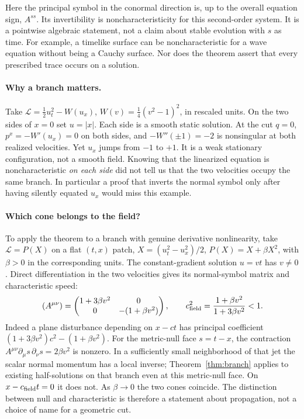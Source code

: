 Here the principal symbol in the conormal direction is, up to the overall equation sign, $A^{ss}$. Its invertibility is noncharacteristicity for this second-order system. It is a pointwise algebraic statement, not a claim about stable evolution with $s$ as time. For example, a timelike surface can be noncharacteristic for a wave equation without being a Cauchy surface. Nor does the theorem assert that every prescribed trace occurs on a solution.

\paragraph{Why a branch matters.} Take $\mathcal L=\tfrac12 u_t^2-W(u_x)$, $W(v)=\tfrac14(v^2-1)^2$, in rescaled units. On the two sides of $x=0$ set $u=|x|$. Each side is a smooth static solution. At the cut $q=0$, $p^x=-W'(u_x)=0$ on both sides, and $-W''(\pm1)=-2$ is nonsingular at both realized velocities. Yet $u_x$ jumps from $-1$ to $+1$. It is a weak stationary configuration, not a smooth field. Knowing that the linearized equation is noncharacteristic \emph{on each side} did not tell us that the two velocities occupy the same branch. In particular a proof that inverts the normal symbol only after having silently equated $u_x$ would miss this example.

\paragraph{Which cone belongs to the field?} To apply the theorem to a branch with genuine derivative nonlinearity, take $\mathcal L=P(X)$ on a flat $(t,x)$ patch, $X=(u_t^2-u_x^2)/2$, $P(X)=X+\beta X^2$, with $\beta>0$ in the corresponding units. The constant-gradient solution $u=v t$ has $v\ne0$. Direct differentiation in the two velocities gives its normal-symbol matrix and characteristic speed:
\[
 (A^{\mu\nu})=\begin{pmatrix}1+3\beta v^2&0\\0&-(1+\beta v^2)\end{pmatrix},\qquad
 c_{\rm field}^2=\frac{1+\beta v^2}{1+3\beta v^2}<1 .
\]
Indeed a plane disturbance depending on $x-c t$ has principal coefficient $(1+3\beta v^2)c^2-(1+\beta v^2)$. For the metric-null face $s=t-x$, the contraction $A^{\mu\nu}\partial_\mu s\,\partial_\nu s=2\beta v^2$ is nonzero. In a sufficiently small neighborhood of that jet the scalar normal momentum has a local inverse; Theorem~\ref{thm:branch} applies to existing half-solutions on that branch even at this metric-null face. On $x-c_{\rm field}t=0$ it does not. As $\beta\to0$ the two cones coincide. The distinction between null and characteristic is therefore a statement about propagation, not a choice of name for a geometric cut.


